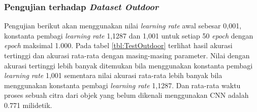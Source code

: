 \subsubsection{Pengujian terhadap \textit{Dataset Outdoor}}
\noindent Pengujian berikut akan menggunakan nilai \textit{learning rate} awal sebesar 0,001, konstanta pembagi \textit{learning rate} 1,1287 dan 1,001 untuk setiap 50 \textit{epoch} dengan \textit{epoch} maksimal 1.000. Pada tabel \ref{tbl:TestOutdoor} terlihat hasil akurasi tertinggi dan akurasi rata-rata dengan masing-masing parameter. Nilai dengan akurasi tertinggi lebih banyak ditemukan bila menggunakan konstanta pembagi \textit{learning rate} 1,001 sementara nilai akurasi rata-rata lebih banyak bila menggunakan konstanta pembagi \textit{learning rate} 1,1287. Dan rata-rata waktu proses sebuah citra dari objek yang belum dikenali menggunakan CNN adalah 0.771 milidetik.
